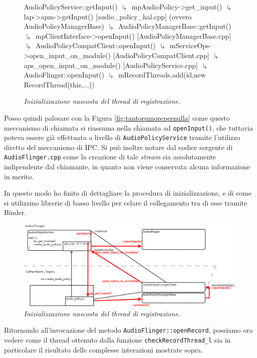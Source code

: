\begin{figure}[thp]
\begin{cpp}[mathescape=tre]
AudioPolicyService::getInput()
$\drsh$ mpAudioPolicy->get_input()
  $\drsh$ lap->apm->getInput() [audio_policy_hal.cpp] (ovvero AudioPolicyManagerBase)
    $\drsh$ AudioPolicyManagerBase::getInput() 
      $\drsh$ mpClientInterface->openInput() [AudioPolicyManagerBase.cpp]
        $\drsh$ AudioPolicyCompatClient::openInput() 
          $\drsh$ mServiceOps->open_input_on_module() [AudioPolicyCompatClient.cpp]
           $\drsh$  aps_open_input_on_module() [AudioPolicyService.cpp]
             $\drsh$ AudioFlinger::openInput() 
              $\drsh$ mRecordThreads.add(id,new RecordThread(this,...))
\end{cpp}
\caption{\textit{Inizializzazione nascosta del thread di registrazione}.}
\label{fig:functioncallThreadAudio}
\end{figure}

Posso quindi palesare con la Figura \vref{fig:tantorumorepernulla} come questo
meccanismo di chiamata si riassuma nella chiamata ad \texttt{\small openInput()},
che tuttavia poteva essere già effettuata a livello di \texttt{\small AudioPolicyService}
tramite l'utilizzo diretto del meccanismo di IPC. 
Si può inoltre notare dal codice sorgente di \texttt{\small AudioFlinger.cpp}
come la creazione di tale \textit{stream} sia assolutamente indipendente dal
chiamante, in quanto non viene conservata alcuna informazione in merito.

In questo modo ho finito di dettagliare la procedura di inizializzazione, e
di come si utilizzino librerie di basso livello per celare il collegamento
tra di esse tramite Binder.
\begin{figure}[thp]
\includegraphics[scale=0.5]{img/modelio/cstructcall.png}
\caption{\textit{Inizializzazione nascosta del thread di registrazione}.}
\label{fig:tantorumorepernulla}
\end{figure}

Ritornando all'invocazione del metodo \texttt{\small AudioFlinger::openRecord}, 
possiamo ora vedere come il thread ottenuto dalla funzione \texttt{checkRecordThread\_l}
sia in particolare il risultato delle complesse interazioni mostrate sopra.
\medskip 


